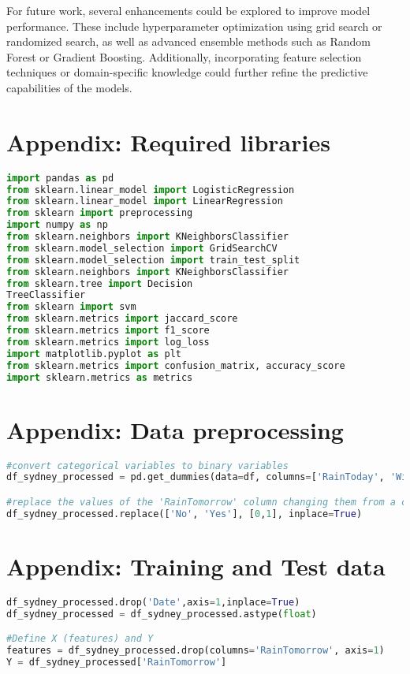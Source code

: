 \documentclass[12pt]{article}
\begin{document}
For future work, several enhancements could be explored to improve model performance. These include hyperparameter optimization using grid search or randomized search, as well as advanced ensemble methods such as Random Forest or Gradient Boosting. Additionally, incorporating feature selection techniques or domain-specific knowledge could further refine the predictive capabilities of the models.
\newpage

\appendix
\section{Appendix: Required libraries}
\begin{lstlisting}[language=Python]
import pandas as pd
from sklearn.linear_model import LogisticRegression
from sklearn.linear_model import LinearRegression
from sklearn import preprocessing
import numpy as np
from sklearn.neighbors import KNeighborsClassifier
from sklearn.model_selection import GridSearchCV
from sklearn.model_selection import train_test_split
from sklearn.neighbors import KNeighborsClassifier
from sklearn.tree import Decision
TreeClassifier
from sklearn import svm
from sklearn.metrics import jaccard_score
from sklearn.metrics import f1_score
from sklearn.metrics import log_loss
import matplotlib.pyplot as plt
from sklearn.metrics import confusion_matrix, accuracy_score
import sklearn.metrics as metrics
\end{lstlisting}

\section{Appendix: Data preprocessing}
\label{appendix:preprocessing}
\begin{lstlisting}[language=Python]
#convert categorical variables to binary variables
df_sydney_processed = pd.get_dummies(data=df, columns=['RainToday', 'WindGustDir', 'WindDir9am', 'WindDir3pm'])

#replace the values of the 'RainTomorrow' column changing them from a categorical column to a binary column
df_sydney_processed.replace(['No', 'Yes'], [0,1], inplace=True)
\end{lstlisting}

\section{Appendix: Training and Test data}
\begin{lstlisting}[language=Python]
df_sydney_processed.drop('Date',axis=1,inplace=True)
df_sydney_processed = df_sydney_processed.astype(float)

#Define X (features) and Y
features = df_sydney_processed.drop(columns='RainTomorrow', axis=1)
Y = df_sydney_processed['RainTomorrow']
\end{lstlisting}
\end{document}

